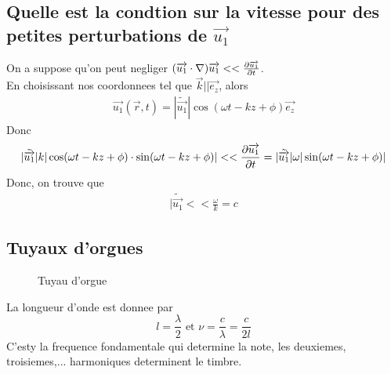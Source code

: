 \documentclass[../main.tex]{subfiles}
\begin{document}
\begin{exemple}
\subsection*{Quelle est la condtion sur la vitesse pour des petites perturbations de $\vec{u_1}$}
On a suppose qu'on peut negliger $ ( \overrightarrow{u_1}\cdot \nabla ) \overrightarrow{u_1}<< \frac{\partial \overrightarrow{u_1}}{\partial t}$.\\
En choisissant nos coordonnees tel que $\vec{k}|| \vec{e_z}$, alors
\begin{align*}
	\vec{u_1}( \vec{r},t) = | \tilde { \vec{u_1}} | \cos ( \omega t- kz + \phi)  \vec{e_z}
\end{align*}
Donc
\begin{align*}
	|\tilde { \overrightarrow{u_1}} | k | \cos ( \omega t - kz + \phi ) \cdot \sin ( \omega t-kz + \phi) | << \frac{\partial \overrightarrow{u_1}}{\partial t} = |\tilde { \overrightarrow{u_1}} | \omega |\sin ( \omega t - kz + \phi) |
\end{align*}
Donc, on trouve que
\begin{align*}
	|\tilde {  \vec{u_1}} << \frac{\omega }{k} =c
\end{align*}

\subsection{Tuyaux d'orgues}
\begin{figure}[H]
    \centering
    \caption{Tuyau d'orgue}
    \label{fig:tuyauorgue}
\end{figure}
La longueur d'onde est donnee par
\[ 
l = \frac{\lambda}{2} \text{ et }  \nu = \frac{c}{\lambda}= \frac{c}{2l}
\]
C'esty la frequence fondamentale qui determine la note, les deuxiemes, troisiemes,... harmoniques determinent le timbre.

			




\end{exemple}
\end{document}
